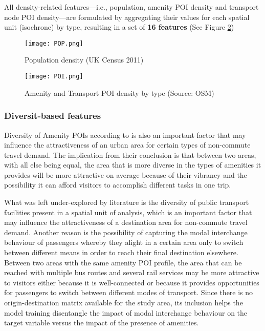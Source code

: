 All density-related features---i.e., population, amenity POI density and transport node POI density---are formulated by aggregating their values for each spatial unit (isochrone) by type, resulting in a set of \textbf{16 features} (See Figure \ref{fig:poi})

\begin{figure}
    \centering
    \texttt{[image: POP.png]}
    \caption{Population density (UK Census 2011)}
    \label{fig:pop}
\end{figure}

\begin{figure}
    \centering
    \texttt{[image: POI.png]}
    \caption{Amenity and Transport POI density by type (Source: OSM)}
    \label{fig:poi}
\end{figure}

\subsubsection*{Diversit-based features}

Diversity of Amenity POIs according to \citet{cerveroTravelDemand3Ds1997} is also an important factor that may influence the attractiveness of an urban area for certain types of non-commute travel demand. The implication from their conclusion is that between two areas, with all else being equal, the area that is more diverse in the types of amenities it provides will be more attractive on average because of their vibrancy and the possibility it can afford visitors to accomplish different tasks in one trip.

What was left under-explored by literature is the diversity of public transport facilities present in a spatial unit of analysis, which is an important factor that may influence the attractiveness of a destination area for non-commute travel demand. Another reason is the possibility of capturing the modal interchange behaviour of passengers whereby they alight in a certain area only to switch between different means in order to reach their final destination elsewhere. Between two areas with the same amenity POI profile, the area that can be reached with multiple bus routes and several rail services may be more attractive to visitors either because it is well-connected or because it provides opportunities for passengers to switch between different modes of transport. Since there is no origin-destination matrix available for the study area, its inclusion helps the model training disentangle the impact of modal interchange behaviour on the target variable versus the impact of the presence of amenities. 

